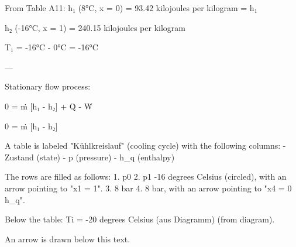 From Table A11:  
h₁ (8°C, x = 0) = 93.42 kilojoules per kilogram = h₁  

h₂ (-16°C, x = 1) = 240.15 kilojoules per kilogram  

T₁ = -16°C - 0°C = -16°C  

---

Stationary flow process:  

0 = ṁ [h₁ - h₂] + Q̇ - Ẇ  

0 = ṁ [h₁ - h₂]

A table is labeled "Kühlkreislauf" (cooling cycle) with the following columns:  
- Zustand (state)  
- p (pressure)  
- h_q (enthalpy)  

The rows are filled as follows:  
1. p0  
2. p1 -16 degrees Celsius (circled), with an arrow pointing to "x1 = 1".  
3. 8 bar  
4. 8 bar, with an arrow pointing to "x4 = 0 h_q".  

Below the table:  
Ti = -20 degrees Celsius (aus Diagramm) (from diagram).  

An arrow is drawn below this text.